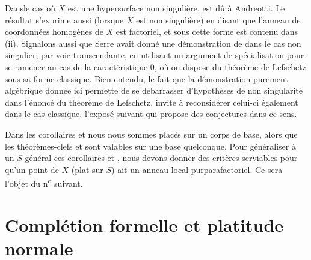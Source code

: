 \begin{remarque} \label{XII.3.8}
Dans\pageoriginale le cas o\`u $X$ est une hypersurface non singuli\`ere,  est d\^u \`a Andreotti. Le r\'esultat  s'exprime aussi (lorsque $X$ est non singuli\`ere) en disant que l'anneau de coordonn\'ees homog\`enes de $X$ est factoriel, et sous cette forme est contenu dans ~ (ii). Signalons aussi que Serre avait donn\'e une d\'emonstration de  dans le cas non singulier, par voie transcendante, en utilisant un argument de sp\'ecialisation pour se ramener au cas de la caract\'eristique 0, o\`u on dispose du th\'eor\`eme de Lefschetz sous sa forme classique. Bien entendu, le fait que la d\'emonstration purement alg\'ebrique donn\'ee ici permette de se d\'ebarrasser d'hypoth\`eses de non singularit\'e dans l'\'enonc\'e du th\'eor\`eme de Lefschetz, invite \`a reconsid\'erer celui-ci \'egalement dans le cas classique. \Cf l'expos\'e suivant qui propose des conjectures dans ce sens.

Dans les corollaires  et  nous nous sommes plac\'es sur un corps de base, alors que les th\'eor\`emes-clefs  et  sont valables sur une base quelconque. Pour g\'en\'eraliser \`a un $S$ g\'en\'eral ces corollaires  et , nous devons donner des crit\`eres serviables pour qu'un point de $X$ (plat sur $S$) ait un anneau local \og pur\fg \resp parafactoriel. Ce sera l'objet du n\textsuperscript{o} suivant.
\end{remarque}

\section{Compl\'etion formelle et platitude normale} \label{XII.4}

\setcounter{equation}{18}

